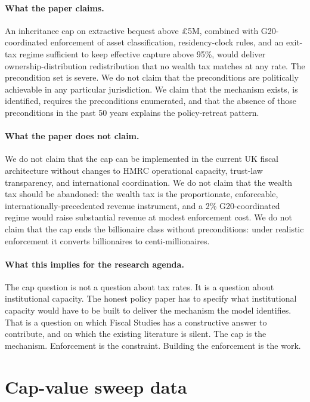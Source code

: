 \documentclass[11pt]{article}
\begin{document}
\paragraph{What the paper claims.}  An inheritance cap on extractive
bequest above \pounds 5M, combined with G20-coordinated enforcement
of asset classification, residency-clock rules, and an exit-tax
regime sufficient to keep effective capture above 95\%, would
deliver ownership-distribution redistribution that no wealth tax
matches at any rate.  The precondition set is severe.  We do not
claim that the preconditions are politically achievable in any
particular jurisdiction.  We claim that the mechanism exists, is
identified, requires the preconditions enumerated, and that the
absence of those preconditions in the past 50 years explains the
policy-retreat pattern.

\paragraph{What the paper does not claim.}  We do not claim that
the cap can be implemented in the current UK fiscal architecture
without changes to HMRC operational capacity, trust-law
transparency, and international coordination.  We do not claim
that the wealth tax should be abandoned: the wealth tax is the
proportionate, enforceable, internationally-precedented revenue
instrument, and a 2\% G20-coordinated regime would raise substantial
revenue at modest enforcement cost.  We do not claim that the cap
ends the billionaire class without preconditions: under
realistic enforcement it converts billionaires to
centi-millionaires.

\paragraph{What this implies for the research agenda.}  The cap
question is not a question about tax rates.  It is a question
about institutional capacity.  The honest policy paper has to
specify what institutional capacity would have to be built to
deliver the mechanism the model identifies.  That is a question
on which Fiscal Studies has a constructive answer to contribute,
and on which the existing literature is silent.  The cap is the
mechanism.  Enforcement is the constraint.  Building the
enforcement is the work.




\appendix
\section{Cap-value sweep data}
\label{app:sweep}
\end{document}
